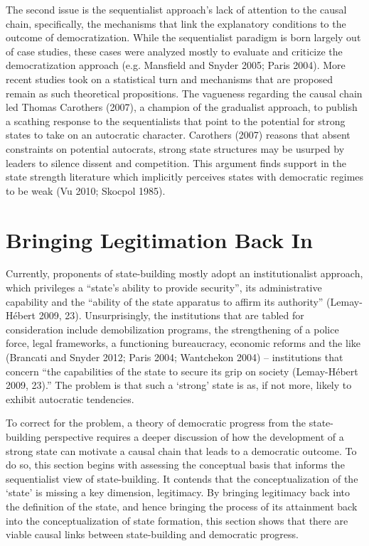 \documentclass [11pt]{article}
\begin{document}
The second issue is the sequentialist approach's lack of attention to the causal chain, specifically, the mechanisms that link the explanatory conditions to the outcome of democratization. While the sequentialist paradigm is born largely out of case studies, these cases were analyzed mostly to evaluate and criticize the democratization approach (e.g. Mansfield and Snyder 2005; Paris 2004). More recent studies took on a statistical turn and mechanisms that are proposed remain as such theoretical propositions. The vagueness regarding the causal chain led Thomas Carothers (2007), a champion of the gradualist approach, to publish a scathing response to the sequentialists that point to the potential for strong states to take on an autocratic character. Carothers (2007) reasons that absent constraints on potential autocrats, strong state structures may be usurped by leaders to silence dissent and competition. This argument finds support in the state strength literature which implicitly perceives states with democratic regimes to be weak (Vu 2010; Skocpol 1985).


\section*{Bringing Legitimation Back In}

Currently, proponents of state-building mostly adopt an institutionalist approach, which privileges a ``state's ability to provide security'', its administrative capability and the ``ability of the state apparatus to affirm its authority'' (Lemay-Hébert 2009, 23). Unsurprisingly, the institutions that are tabled for consideration include demobilization programs, the strengthening of a police force, legal frameworks, a functioning bureaucracy, economic reforms and the like (Brancati and Snyder 2012; Paris 2004; Wantchekon 2004) -- institutions that concern ``the capabilities of the state to secure its grip on society (Lemay-Hébert 2009, 23).'' The problem is that such a `strong' state is as, if not more, likely to exhibit autocratic tendencies. 

To correct for the problem, a theory of democratic progress from the state-building perspective requires a deeper discussion of how the development of a strong state can motivate a causal chain that leads to a democratic outcome. To do so, this section begins with assessing the conceptual basis that informs the sequentialist view of state-building. It contends that the conceptualization of the `state' is missing a key dimension, legitimacy. By bringing legitimacy back into the definition of the state, and hence bringing the process of its attainment back into the conceptualization of state formation, this section shows that there are viable causal links between state-building and democratic progress.
\end{document}
